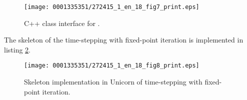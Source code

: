 \begin{figure}[!t]
\bwfig
\texttt{[image: 0001335351/272415\_1\_en\_18\_fig7\_print.eps]}
\caption{C++ class interface for .}
\label{code:TimeDependentPDE}
\end{figure}
The skeleton of the time-stepping with fixed-point iteration is
implemented in listing \ref{code:time-stepping}.

\begin{figure}[!t]
\bwfig
\texttt{[image: 0001335351/272415\_1\_en\_18\_fig8\_print.eps]}
\caption{Skeleton implementation in Unicorn of time-stepping with
fixed-point iteration.}
\label{code:time-stepping}
\end{figure}

